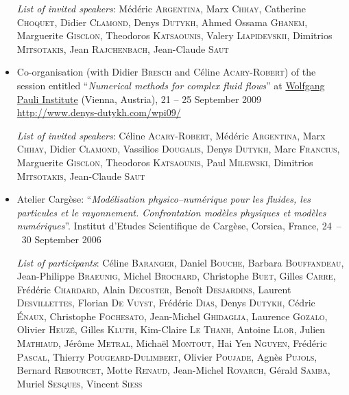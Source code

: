 \documentclass[final, a4paper, oneside, 12pt]{article}
\numberwithin{equation}{section}
\begin{document}
\begin{itemize}
  \textit{List of invited speakers}: M\'ed\'eric \textsc{Argentina}, Marx \textsc{Chhay}, Catherine \textsc{Choquet}, Didier \textsc{Clamond}, Denys \textsc{Dutykh}, Ahmed Ossama \textsc{Ghanem}, Marguerite \textsc{Gisclon}, Theodoros \textsc{Katsaounis}, Valery \textsc{Liapidevskii}, Dimitrios \textsc{Mitsotakis}, Jean \textsc{Rajchenbach}, Jean-Claude \textsc{Saut}

  \item Co-organisation (with Didier \textsc{Bresch} and C\'eline \textsc{Acary-Robert}) of the session entitled ``\textit{Numerical methods for complex fluid flows}'' at \href{http://www.wpi.ac.at/}{Wolfgang Pauli Institute} (Vienna, Austria), 21 -- 25 September 2009 \\
  \url{http://www.denys-dutykh.com/wpi09/}
  
  \textit{List of invited speakers}: C\'eline \textsc{Acary-Robert}, M\'ed\'eric \textsc{Argentina}, Marx \textsc{Chhay}, Didier \textsc{Clamond}, Vassilios \textsc{Dougalis}, Denys \textsc{Dutykh}, Marc \textsc{Francius}, Marguerite \textsc{Gisclon}, Theodoros \textsc{Katsaounis}, Paul \textsc{Milewski}, Dimitrios \textsc{Mitsotakis}, Jean-Claude \textsc{Saut}

  \item Atelier Carg\`ese: ``\textit{Mod\'elisation physico--num\'erique pour les fluides, les particules et le rayonnement. Confrontation mod\`eles physiques et mod\`eles num\'eriques}''. Institut d'Etudes Scientifique de Carg\`ese, Corsica, France, 24~--~30 September 2006
  
  \textit{List of participants}: C\'eline \textsc{Baranger}, Daniel \textsc{Bouche}, Barbara \textsc{Bouffandeau}, Jean-Philippe \textsc{Braeunig}, Michel \textsc{Brochard}, Christophe \textsc{Buet}, Gilles \textsc{Carre}, Fr\'ed\'eric \textsc{Chardard}, Alain \textsc{Decoster}, Beno\^it \textsc{Desjardins}, Laurent \textsc{Desvillettes}, Florian \textsc{De Vuyst}, Fr\'ed\'eric \textsc{Dias}, Denys \textsc{Dutykh}, C\'edric \textsc{\'Enaux}, Christophe \textsc{Fochesato}, Jean-Michel \textsc{Ghidaglia}, Laurence \textsc{Gozalo}, Olivier \textsc{Heuz\'e}, Gilles \textsc{Kluth}, Kim-Claire \textsc{Le Thanh}, Antoine \textsc{Llor}, Julien \textsc{Mathiaud}, J\'er\^ome \textsc{Metral}, Micha\"el \textsc{Montout}, Hai Yen \textsc{Nguyen}, Fr\'ed\'eric \textsc{Pascal}, Thierry \textsc{Pougeard-Dulimbert}, Olivier \textsc{Poujade}, Agn\`es \textsc{Pujols}, Bernard \textsc{Rebourcet}, Motte \textsc{Renaud}, Jean-Michel \textsc{Rovarch}, G\'erald \textsc{Samba}, Muriel \textsc{Sesques}, Vincent \textsc{Siess}

\end{itemize}
\end{document}
